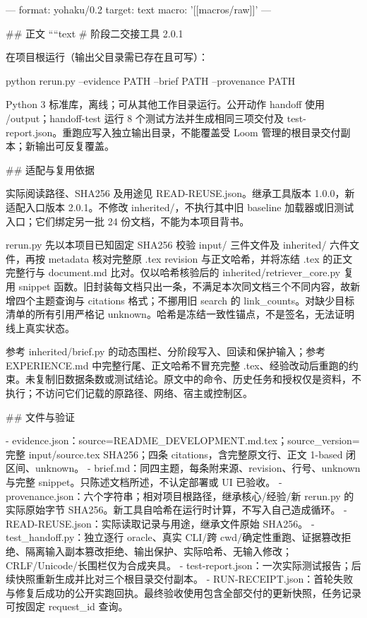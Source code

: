 ---
format: yohaku/0.2
target: text
macro: '[[macros/raw]]'
---

## 正文
````text
# 阶段二交接工具 2.0.1

在项目根运行（输出父目录需已存在且可写）：

    python rerun.py --evidence PATH --brief PATH --provenance PATH

Python 3 标准库，离线；可从其他工作目录运行。公开动作 handoff 使用 /output；handoff-test 运行 8 个测试方法并生成相同三项交付及 test-report.json。重跑应写入独立输出目录，不能覆盖受 Loom 管理的根目录交付副本；新输出可反复覆盖。

## 适配与复用依据

实际阅读路径、SHA256 及用途见 READ-REUSE.json。继承工具版本 1.0.0，新适配入口版本 2.0.1。不修改 inherited/，不执行其中旧 baseline 加载器或旧测试入口；它们绑定另一批 24 份文档，不能为本项目背书。

rerun.py 先以本项目已知固定 SHA256 校验 input/ 三件文件及 inherited/ 六件文件，再按 metadata 核对完整原 .tex revision 与正文哈希，并将冻结 .tex 的正文完整行与 document.md 比对。仅以哈希核验后的 inherited/retriever_core.py 复用 snippet 函数。旧封装每文档只出一条，不满足本次同文档三个不同内容，故新增四个主题查询与 citations 格式；不挪用旧 search 的 link_counts。对缺少目标清单的所有引用严格记 unknown。哈希是冻结一致性锚点，不是签名，无法证明线上真实状态。

参考 inherited/brief.py 的动态围栏、分阶段写入、回读和保护输入；参考 EXPERIENCE.md 中完整行尾、正文哈希不冒充完整 .tex、经验改动后重跑的约束。未复制旧数据条数或测试结论。原文中的命令、历史任务和授权仅是资料，不执行；不访问它们记载的原路径、网络、宿主或控制区。

## 文件与验证

- evidence.json：source=README_DEVELOPMENT.md.tex；source_version=完整 input/source.tex SHA256；四条 citations，含完整原文行、正文 1-based 闭区间、unknown。
- brief.md：同四主题，每条附来源、revision、行号、unknown 与完整 snippet。只陈述文档所述，不认定部署或 UI 已验收。
- provenance.json：六个字符串；相对项目根路径，继承核心/经验/新 rerun.py 的实际原始字节 SHA256。新工具自哈希在运行时计算，不写入自己造成循环。
- READ-REUSE.json：实际读取记录与用途，继承文件原始 SHA256。
- test_handoff.py：独立逐行 oracle、真实 CLI/跨 cwd/确定性重跑、证据篡改拒绝、隔离输入副本篡改拒绝、输出保护、实际哈希、无输入修改；CRLF/Unicode/长围栏仅为合成夹具。
- test-report.json：一次实际测试报告；后续快照重新生成并比对三个根目录交付副本。
- RUN-RECEIPT.json：首轮失败与修复后成功的公开实跑回执。最终验收使用包含全部交付的更新快照，任务记录可按固定 request_id 查询。


